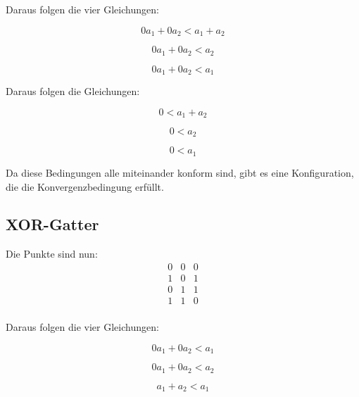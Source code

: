 \documentclass[11pt]{article} %
\begin{document}
Daraus folgen die vier Gleichungen:

\begin{equation}
0 a_{1} + 0 a_{2} < a_{1} + a_{2}
\end{equation}

\begin{equation}
0 a_{1} + 0 a_{2}<  a_{2}
\end{equation}

\begin{equation}
0 a_{1} + 0 a_{2} < a_{1} 
\end{equation}

Daraus folgen die Gleichungen:

\begin{equation}
0 < a_{1} + a_{2}
\end{equation}

\begin{equation}
0 < a_{2}
\end{equation}

\begin{equation}
0 < a_{1} 
\end{equation}

Da diese Bedingungen alle miteinander konform sind, gibt es eine Konfiguration, die die Konvergenzbedingung erfüllt.

\subsection{XOR-Gatter}

Die Punkte sind nun:
\begin{equation}
\begin{matrix}
0 & 0 & 0\\
1 & 0 & 1\\
0 & 1 & 1 \\
1 & 1 & 0 \\
\end{matrix} 
\end{equation}

Daraus folgen die vier Gleichungen:

\begin{equation}
0 a_{1} + 0 a_{2} < a_{1} 
\end{equation}

\begin{equation}
0 a_{1} + 0 a_{2}<  a_{2}
\end{equation}

\begin{equation}
a_{1} + a_{2} < a_{1} 
\end{equation}
\end{document}
